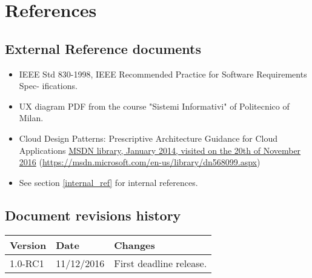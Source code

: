 \section{References}


\subsection{External Reference documents}
\label{external_ref}
\begin{itemize}
    \item IEEE Std 830-1998, IEEE Recommended Practice for Software Requirements Spec- ifications.
    \item UX diagram PDF from the course "Sistemi Informativi" of Politecnico of Milan.
    \item Cloud Design Patterns: Prescriptive Architecture Guidance for Cloud Applications \href{https://msdn.microsoft.com/en-us/library/dn568099.aspx}{MSDN library, January 2014, visited on the 20th of November 2016} (\url{https://msdn.microsoft.com/en-us/library/dn568099.aspx})
    \item See section \ref{internal_ref} for internal references.
\end{itemize}



\subsection{Document revisions history}
\begin{tabular}{| l | l | p{10cm} |}
\hline
\textbf{Version} & \textbf{Date} & \textbf{Changes}\\
\hline
1.0-RC1 & 11/12/2016 & First deadline release.\\
\hline
\end{tabular} 